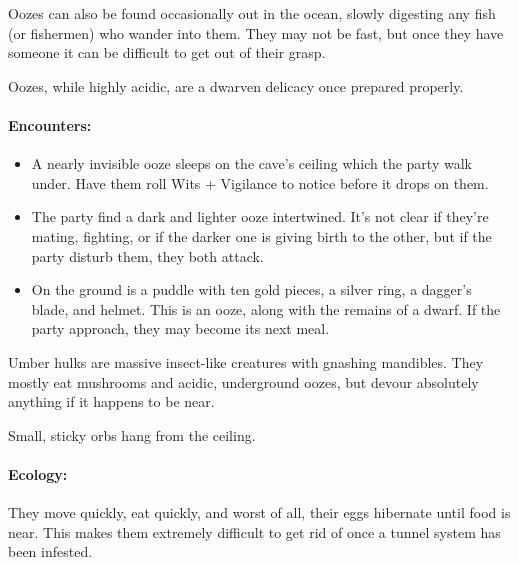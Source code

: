 \begin{multicols}{2}
Oozes can also be found occasionally out in the ocean, slowly digesting any fish (or fishermen) who wander into them.
They may not be fast, but once they have someone it can be difficult to get out of their grasp.

Oozes, while highly acidic, are a dwarven delicacy once prepared properly.

\needspace{3em}
\paragraph{Encounters:}

\begin{itemize}

  \item
  A nearly invisible ooze sleeps on the cave's ceiling which the party walk under.
  Have them roll Wits + Vigilance to notice before it drops on them.
  \item
  The party find a dark and lighter ooze intertwined.
  It's not clear if they're mating, fighting, or if the darker one is giving birth to the other, but if the party disturb them, they both attack.
  \item
  On the ground is a puddle with ten gold pieces, a silver ring, a dagger's blade, and helmet.
  This is an ooze, along with the remains of a dwarf.
  If the party approach, they may become its next meal.

\end{itemize}

\jelly

\jelly

\label{umber_hulk}

Umber hulks are massive insect-like creatures with gnashing mandibles.
They mostly eat mushrooms and acidic, underground oozes, but devour absolutely anything if it happens to be near.

\begin{boxtext}

  Small, sticky orbs hang from the ceiling.

\end{boxtext}

\paragraph{Ecology:}
They move quickly, eat quickly, and worst of all, their eggs hibernate until food is near.
This makes them extremely difficult to get rid of once a tunnel system has been infested.


\end{multicols}
